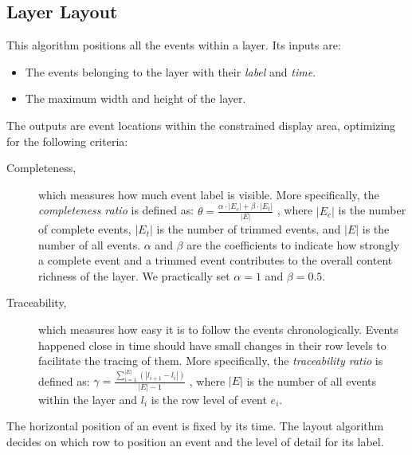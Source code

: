 \subsection{Layer Layout}
This algorithm positions all the events within a layer. Its inputs are:
\begin{itemize}
	\item The events belonging to the layer with their \emph{label} and \emph{time}.
	\item The maximum width and height of the layer.
\end{itemize}
The outputs are event locations within the constrained display area, optimizing for the following criteria:
\begin{description}
	\item[Completeness,] which measures how much event label is visible. More specifically, the \textit{completeness ratio} is defined as:
	$\theta = \frac{\alpha \cdot |E_c| + \beta \cdot |E_t|}{|E|}$
	, where $|E_c|$ is the number of complete events, $|E_t|$ is the number of trimmed events, and $|E|$ is the number of all events. $\alpha$ and $\beta$ are the coefficients to indicate how strongly a complete event and a trimmed event contributes to the overall content richness of the layer. We practically set $\alpha=1$ and $\beta=0.5$.
	
	\item[Traceability,]which measures how easy it is to follow the events chronologically. Events happened close in time should have small changes in their row levels to facilitate the tracing of them. More specifically, the \textit{traceability ratio} is defined as:
$	\gamma=\frac{\sum\limits_{i=1}^{|E|}(|l_{i+1} - l_i|)}{|E|-1}$
	, where $|E|$ is the number of all events within the layer and $l_i$ is the row level of event $e_i$. 	
\end{description}

The horizontal position of an event is fixed by its time. The layout algorithm decides on which row to position an event and the level of detail for its label.

